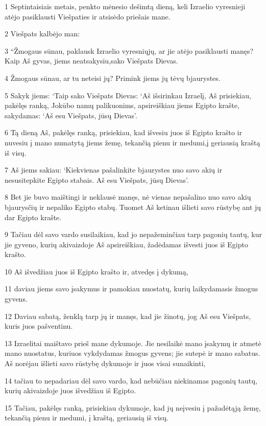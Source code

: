 \par 1 Septintaisiais metais, penkto mėnesio dešimtą dieną, keli Izraelio vyresnieji atėjo pasiklausti Viešpaties ir atsisėdo priešais mane. 
\par 2 Viešpats kalbėjo man: 
\par 3 “Žmogaus sūnau, paklausk Izraelio vyresniųjų, ar jie atėjo pasiklausti manęs? Kaip Aš gyvas, jiems neatsakysiu,­sako Viešpats Dievas.­ 
\par 4 Žmogaus sūnau, ar tu neteisi jų? Primink jiems jų tėvų bjaurystes. 
\par 5 Sakyk jiems: ‘Taip sako Viešpats Dievas: ‘Aš išsirinkau Izraelį, Aš prisiekiau, pakėlęs ranką, Jokūbo namų palikuonims, apsireiškiau jiems Egipto krašte, sakydamas: ‘Aš esu Viešpats, jūsų Dievas’. 
\par 6 Tą dieną Aš, pakėlęs ranką, prisiekiau, kad išvesiu juos iš Egipto krašto ir nuvesiu į mano numatytą jiems žemę, tekančią pienu ir medumi,­į geriausią kraštą iš visų. 
\par 7 Aš jiems sakiau: ‘Kiekvienas pašalinkite bjaurystes nuo savo akių ir nesusitepkite Egipto stabais. Aš esu Viešpats, jūsų Dievas’. 
\par 8 Bet jie buvo maištingi ir neklausė manęs, nė vienas nepašalino nuo savo akių bjaurysčių ir nepaliko Egipto stabų. Tuomet Aš ketinau išlieti savo rūstybę ant jų dar Egipto krašte. 
\par 9 Tačiau dėl savo vardo susilaikiau, kad jo nepažeminčiau tarp pagonių tautų, kur jie gyveno, kurių akivaizdoje Aš apsireiškiau, žadėdamas išvesti juos iš Egipto krašto. 
\par 10 Aš išvedžiau juos iš Egipto krašto ir, atvedęs į dykumą, 
\par 11 daviau jiems savo įsakymus ir pamokiau nuostatų, kurių laikydamasis žmogus gyvens. 
\par 12 Daviau sabatą, ženklą tarp jų ir manęs, kad jie žinotų, jog Aš esu Viešpats, kuris juos pašventinu. 
\par 13 Izraelitai maištavo prieš mane dykumoje. Jie nesilaikė mano įsakymų ir atmetė mano nuostatus, kuriuos vykdydamas žmogus gyvens; jie sutepė ir mano sabatus. Aš norėjau išlieti savo rūstybę dykumoje ir juos visai sunaikinti, 
\par 14 tačiau to nepadariau dėl savo vardo, kad nebūčiau niekinamas pagonių tautų, kurių akivaizdoje juos išvedžiau iš Egipto. 
\par 15 Tačiau, pakėlęs ranką, prisiekiau dykumoje, kad jų neįvesiu į pažadėtąją žemę, tekančią pienu ir medumi, į kraštą, geriausią iš visų. 
